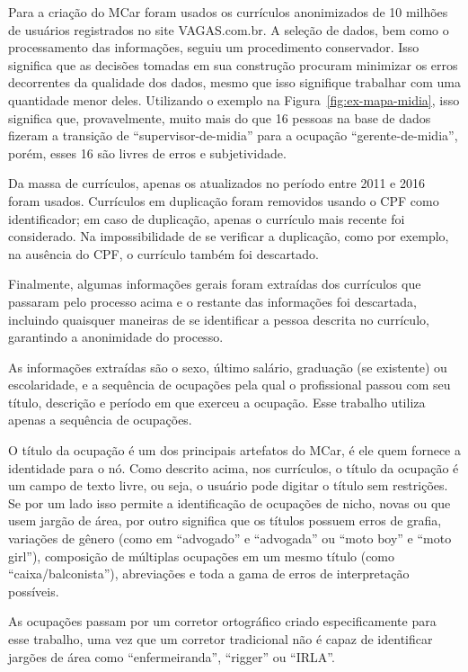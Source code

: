\documentclass[
  article,
  11pt,
  a4paper,
  english,
  brazil,
  sumario=tradicional]{abntex2}
\begin{document}
Para a criação do MCar foram usados os currículos anonimizados de 10 milhões de usuários registrados no site VAGAS.com.br. A seleção de dados, bem como o processamento das informações, seguiu um procedimento conservador. Isso significa que as decisões tomadas em sua construção procuram minimizar os erros decorrentes da qualidade dos dados, mesmo que isso signifique trabalhar com uma quantidade menor deles. Utilizando o exemplo na Figura~\ref{fig:ex-mapa-midia}, isso significa que, provavelmente, muito mais do que 16 pessoas na base de dados fizeram a transição de \enquote{supervisor-de-midia} para a ocupação \enquote{gerente-de-midia}, porém, esses 16 são livres de erros e subjetividade.

Da massa de currículos, apenas os atualizados no período entre 2011 e 2016 foram usados. Currículos em duplicação foram removidos usando o CPF como identificador; em caso de duplicação, apenas o currículo mais recente foi considerado. Na impossibilidade de se verificar a duplicação, como por exemplo, na ausência do CPF, o currículo também foi descartado.

Finalmente, algumas informações gerais foram extraídas dos currículos que passaram pelo processo acima e o restante das informações foi descartada, incluindo quaisquer maneiras de se identificar a pessoa descrita no currículo, garantindo a anonimidade do processo.

As informações extraídas são o sexo, último salário, graduação (se existente) ou escolaridade, e a sequência de ocupações pela qual o profissional passou com seu título, descrição e período em que exerceu a ocupação. Esse trabalho utiliza apenas a sequência de ocupações.

O título da ocupação é um dos principais artefatos do MCar, é ele quem fornece a identidade para o nó. Como descrito acima, nos currículos, o título da ocupação é um campo de texto livre, ou seja, o usuário pode digitar o título sem restrições. Se por um lado isso permite a identificação de ocupações de nicho, novas ou que usem jargão de área, por outro significa que os títulos possuem erros de grafia, variações de gênero (como em \enquote{advogado} e \enquote{advogada} ou \enquote{moto boy} e \enquote{moto girl}), composição de múltiplas ocupações em um mesmo título (como \enquote{caixa/balconista}), abreviações e toda a gama de erros de interpretação possíveis.

As ocupações passam por um corretor ortográfico criado especificamente para esse trabalho, uma vez que um corretor tradicional não é capaz de identificar jargões de área como \enquote{enfermeiranda}, \enquote{rigger} ou \enquote{IRLA}.
\end{document}
